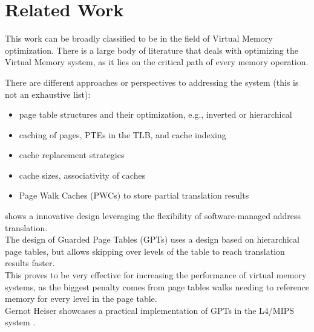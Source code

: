\chapter{Related Work}

\label{chap:related}
This work can be broadly classified to be in the field of Virtual Memory optimization. There is a large body of literature that deals with optimizing the Virtual Memory system, as it lies on the critical path of every memory operation.

There are different approaches or perspectives to addressing the system (this is not an exhaustive list):

\begin{itemize}
    \item page table structures and their optimization, e.g., inverted or hierarchical
    \item caching of pages, PTEs in the TLB, and cache indexing
    \item cache replacement strategies
    \item cache sizes, associativity of caches
    \item Page Walk Caches (PWCs) to store partial translation results
\end{itemize}



\textbf{\cite{liedtkeGPT}} shows a innovative design leveraging the flexibility of software-managed
address translation.\\
The design of Guarded Page Tables (GPTs) uses a design based on hierarchical page tables, but allows skipping over levels of the table to reach translation results faster.\\
This proves to be very effective for increasing the performance of virtual memory systems, as the biggest penalty comes from page tables walks needing to reference memory for every level in the page table.\\
Gernot Heiser showcases a practical implementation of GPTs in the L4/MIPS system \cite{heiserAnatomyHighPerformanceMicrokernel}.




